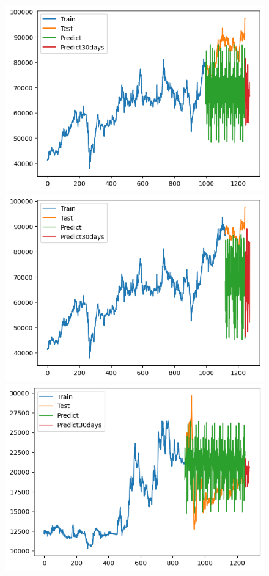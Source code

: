 \begin{figure}[H]
\begin{minipage}{0.15\textwidth}
    \includegraphics[width=1\textwidth]{resources/chapter-5/result/VCB_ML_8_2.png}
    \end{minipage}
    \hfill
        \begin{minipage}{0.15\textwidth}
    \centering
    \includegraphics[width=1\textwidth]{resources/chapter-5/result/VCB_ML_9_1.png}
    \end{minipage}
    \hfill
    \begin{minipage}{0.15\textwidth}
    \centering
    \includegraphics[width=1\textwidth]{resources/chapter-5/result/EXB_ML_7_3.png}

\end{minipage}
\end{figure}
